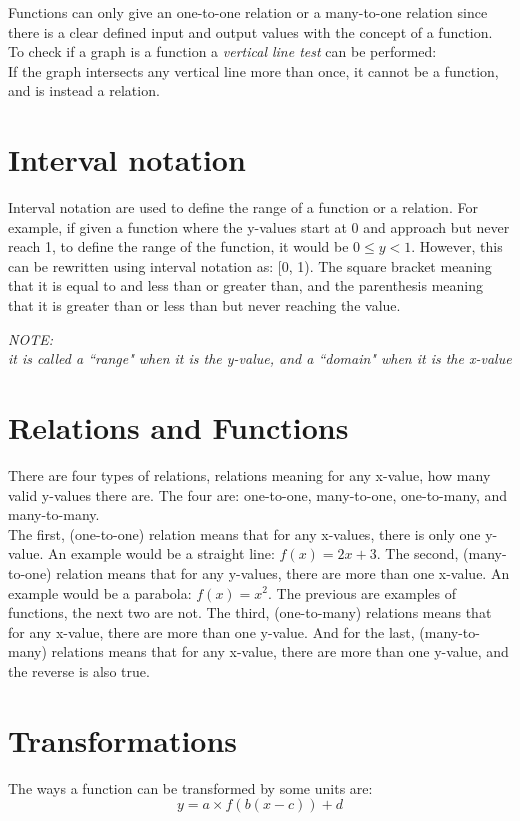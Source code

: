 \documentclass{book}
\newenvironment{note}{\begin{center}\em NOTE:\\}{\end{center}}
\begin{document}
Functions can only give an one-to-one relation or a many-to-one relation since there is a clear defined input and output values with the concept of a function.  To check if a graph is a function a \emph{vertical line test} can be performed:\\

If the graph intersects any vertical line more than once, it cannot be a function, and is instead a relation.

\chapter{Interval notation}
Interval notation are used to define the range of a function or a relation.  For example, if given a function where the y-values start at 0 and approach but never reach 1, to define the range of the function, it would be $0 \leq y < 1$.  However, this can be rewritten using interval notation as: [0, 1).  The square bracket meaning that it is equal to and less than or greater than, and the parenthesis meaning that it is greater than or less than but never reaching the value.\\

\begin{note}
	it is called a ``range" when it is the y-value, and a ``domain" when it is the x-value
\end{note}

\chapter{Relations and Functions}
There are four types of relations, relations meaning for any x-value, how many valid y-values there are.  The four are: one-to-one, many-to-one, one-to-many, and many-to-many.\\

The first, (one-to-one) relation means that for any x-values, there is only one y-value.  An example would be a straight line: $f(x) = 2x + 3$.  The second, (many-to-one) relation means that for any y-values, there are more than one x-value.  An example would be a parabola: $f(x) = x^2$.  The previous are examples of functions, the next two are not.  The third, (one-to-many) relations means that for any x-value, there are more than one y-value.  And for the last, (many-to-many) relations means that for any x-value, there are more than one y-value, and the reverse is also true.

\chapter{Transformations}
The ways a function can be transformed by some units are:
\[
	y = a \times f(b(x - c)) + d
\]
\end{document}
